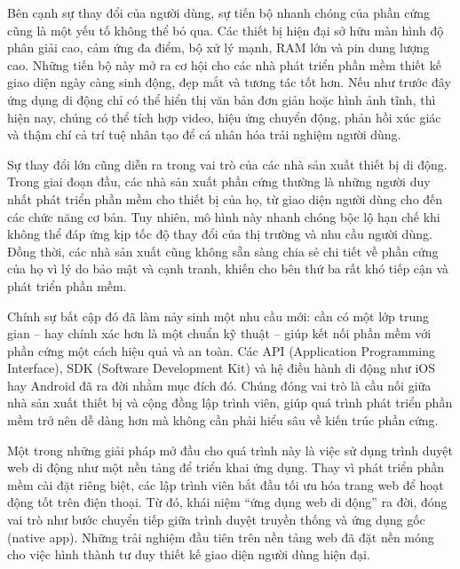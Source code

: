   \begin{flushleft}
    \hspace*{0.8cm}Bên cạnh sự thay đổi của người dùng, sự tiến bộ nhanh chóng của phần cứng cũng là một yếu tố không thể bỏ qua. Các thiết bị hiện đại sở hữu màn hình độ phân giải cao, cảm ứng đa điểm, bộ xử lý mạnh, RAM lớn và pin dung lượng cao. Những tiến bộ này mở ra cơ hội cho các nhà phát triển phần mềm thiết kế giao diện ngày càng sinh động, đẹp mắt và tương tác tốt hơn. Nếu như trước đây ứng dụng di động chỉ có thể hiển thị văn bản đơn giản hoặc hình ảnh tĩnh, thì hiện nay, chúng có thể tích hợp video, hiệu ứng chuyển động, phản hồi xúc giác và thậm chí cả trí tuệ nhân tạo để cá nhân hóa trải nghiệm người dùng.
  \end{flushleft}

  \begin{flushleft}
    \hspace*{0.8cm}Sự thay đổi lớn cũng diễn ra trong vai trò của các nhà sản xuất thiết bị di động. Trong giai đoạn đầu, các nhà sản xuất phần cứng thường là những người duy nhất phát triển phần mềm cho thiết bị của họ, từ giao diện người dùng cho đến các chức năng cơ bản. Tuy nhiên, mô hình này nhanh chóng bộc lộ hạn chế khi không thể đáp ứng kịp tốc độ thay đổi của thị trường và nhu cầu người dùng. Đồng thời, các nhà sản xuất cũng không sẵn sàng chia sẻ chi tiết về phần cứng của họ vì lý do bảo mật và cạnh tranh, khiến cho bên thứ ba rất khó tiếp cận và phát triển phần mềm.
  \end{flushleft}

  \begin{flushleft}
    \hspace*{0.8cm}Chính sự bất cập đó đã làm nảy sinh một nhu cầu mới: cần có một lớp trung gian – hay chính xác hơn là một chuẩn kỹ thuật – giúp kết nối phần mềm với phần cứng một cách hiệu quả và an toàn. Các API (Application Programming Interface), SDK (Software Development Kit) và hệ điều hành di động như iOS hay Android đã ra đời nhằm mục đích đó. Chúng đóng vai trò là cầu nối giữa nhà sản xuất thiết bị và cộng đồng lập trình viên, giúp quá trình phát triển phần mềm trở nên dễ dàng hơn mà không cần phải hiểu sâu về kiến trúc phần cứng.
  \end{flushleft}

  \begin{flushleft}
    \hspace*{0.8cm}Một trong những giải pháp mở đầu cho quá trình này là việc sử dụng trình duyệt web di động như một nền tảng để triển khai ứng dụng. Thay vì phát triển phần mềm cài đặt riêng biệt, các lập trình viên bắt đầu tối ưu hóa trang web để hoạt động tốt trên điện thoại. Từ đó, khái niệm “ứng dụng web di động” ra đời, đóng vai trò như bước chuyển tiếp giữa trình duyệt truyền thống và ứng dụng gốc (native app). Những trải nghiệm đầu tiên trên nền tảng web đã đặt nền móng cho việc hình thành tư duy thiết kế giao diện người dùng hiện đại.
  \end{flushleft}

